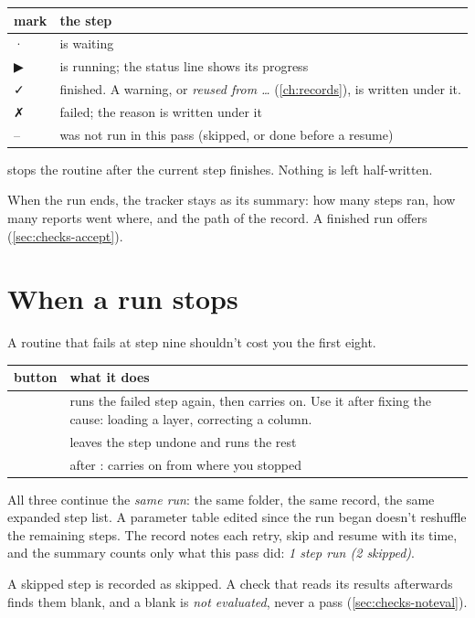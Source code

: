 \begin{tabularx}{\linewidth}{@{}lL@{}}\toprule
mark & the step \\ \midrule
· & is waiting \\
▶ & is running; the status line shows its progress \\
✓ & finished. A warning, or \emph{reused from …} (\cref{ch:records}), is written under it. \\
✗ & failed; the reason is written under it \\
– & was not run in this pass (skipped, or done before a resume) \\
\bottomrule
\end{tabularx}

 stops the routine after the current step finishes. Nothing is left half-written.

When the run ends, the tracker stays as its summary: how many steps ran, how many reports went where, and the path of the record. A finished run offers  (\cref{sec:checks-accept}).

\section{When a run stops}\label{sec:routines-stops}
A routine that fails at step nine shouldn't cost you the first eight.

\begin{tabularx}{\linewidth}{@{}lL@{}}\toprule
button & what it does \\ \midrule
{} & runs the failed step again, then carries on. Use it after fixing the cause: loading a layer, correcting a column. \\
 & leaves the step undone and runs the rest \\
 & after : carries on from where you stopped \\
\bottomrule
\end{tabularx}

All three continue the \emph{same run}: the same folder, the same record, the same expanded step list. A parameter table edited since the run began doesn't reshuffle the remaining steps. The record notes each retry, skip and resume with its time, and the summary counts only what this pass did: \emph{1 step run (2 skipped)}.

\begin{note}
A skipped step is recorded as skipped. A check that reads its results afterwards finds them blank, and a blank is \emph{not evaluated}, never a pass (\cref{sec:checks-noteval}).
\end{note}

